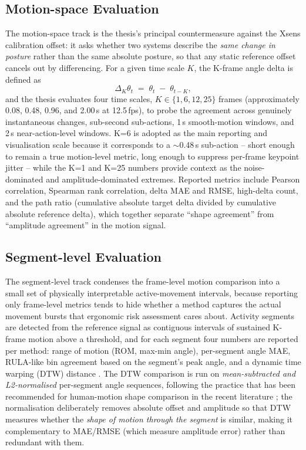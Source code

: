 \documentclass[12pt,a4paper]{article}
\begin{document}
\subsection{Motion-space Evaluation}

The motion-space track is the thesis's principal countermeasure against
the Xsens calibration offset: it asks whether two systems describe the
\emph{same change in posture} rather than the same absolute posture, so
that any static reference offset cancels out by differencing.
For a given time scale $K$, the K-frame angle delta is defined as
\begin{equation}
  \Delta_K \theta_t \;=\; \theta_t \;-\; \theta_{t-K},
\end{equation}
and the thesis evaluates four time scales, $K\in\{1,6,12,25\}$ frames
(approximately 0.08, 0.48, 0.96, and 2.00\,s at 12.5\,fps), to probe the
agreement across genuinely instantaneous changes, sub-second sub-actions,
1\,s smooth-motion windows, and 2\,s near-action-level windows.
K=6 is adopted as the main reporting and visualisation scale because it
corresponds to a $\sim$0.48\,s sub-action -- short enough to remain a
true motion-level metric, long enough to suppress per-frame keypoint
jitter -- while the K=1 and K=25 numbers provide context as the
noise-dominated and amplitude-dominated extremes.
Reported metrics include Pearson correlation, Spearman rank correlation,
delta MAE and RMSE, high-delta count, and the path ratio (cumulative
absolute target delta divided by cumulative absolute reference delta),
which together separate ``shape agreement'' from ``amplitude agreement''
in the motion signal.

\subsection{Segment-level Evaluation}

The segment-level track condenses the frame-level motion comparison into
a small set of physically interpretable active-movement intervals,
because reporting only frame-level metrics tends to hide whether a method
captures the actual movement bursts that ergonomic risk assessment cares
about.
Activity segments are detected from the reference signal as contiguous
intervals of sustained K-frame motion above a threshold, and for each
segment four numbers are reported per method: range of motion (ROM,
max-min angle), per-segment angle MAE, RULA-like bin agreement based on
the segment's peak angle, and a dynamic time warping (DTW) distance
\cite{sakoe1978dtw}.
The DTW comparison is run on \emph{mean-subtracted and L2-normalised}
per-segment angle sequences, following the practice that has been
recommended for human-motion shape comparison in the recent literature
\cite{perezluque2026reaching}; the normalisation deliberately removes
absolute offset and amplitude so that DTW measures whether the
\emph{shape of motion through the segment} is similar, making it
complementary to MAE/RMSE (which measure amplitude error) rather than
redundant with them.
\end{document}

